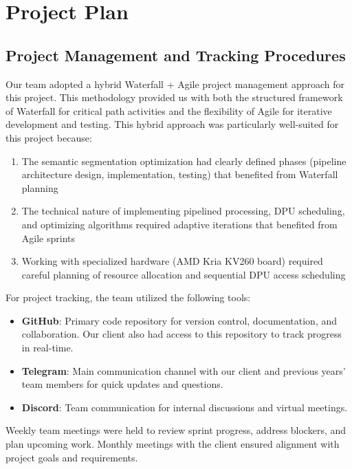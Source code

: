 \chapter{Project Plan}\label{chap:project-plan}

\section{Project Management and Tracking Procedures}\label{sec:management-procedures}

Our team adopted a hybrid Waterfall + Agile project management approach for this project. This methodology provided us with both the structured framework of Waterfall for critical path activities and the flexibility of Agile for iterative development and testing. This hybrid approach was particularly well-suited for this project because:

\begin{enumerate}
\item The semantic segmentation optimization had clearly defined phases (pipeline architecture design, implementation, testing) that benefited from Waterfall planning
\item The technical nature of implementing pipelined processing, DPU scheduling, and optimizing algorithms required adaptive iterations that benefited from Agile sprints
\item Working with specialized hardware (AMD Kria KV260 board) required careful planning of resource allocation and sequential DPU access scheduling
\end{enumerate}

For project tracking, the team utilized the following tools:

\begin{itemize}
\item \textbf{GitHub}: Primary code repository for version control, documentation, and collaboration. Our client also had access to this repository to track progress in real-time.
\item \textbf{Telegram}: Main communication channel with our client and previous years' team members for quick updates and questions.
\item \textbf{Discord}: Team communication for internal discussions and virtual meetings.
\end{itemize}

Weekly team meetings were held to review sprint progress, address blockers, and plan upcoming work. Monthly meetings with the client ensured alignment with project goals and requirements.

